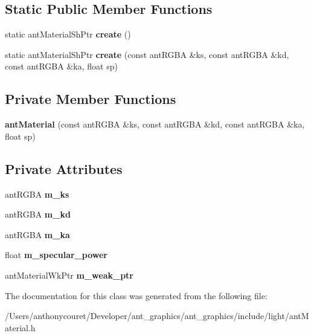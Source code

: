 \subsection*{Static Public Member Functions}
\begin{DoxyCompactItemize}
\item 
\hypertarget{classant_material_a56f8f32c820e73b5944519d3e292dc37}{static ant\+Material\+Sh\+Ptr {\bfseries create} ()}\label{classant_material_a56f8f32c820e73b5944519d3e292dc37}

\item 
\hypertarget{classant_material_af41bd92b1e438fdcef620d225f1164d1}{static ant\+Material\+Sh\+Ptr {\bfseries create} (const ant\+R\+G\+B\+A \&ks, const ant\+R\+G\+B\+A \&kd, const ant\+R\+G\+B\+A \&ka, float sp)}\label{classant_material_af41bd92b1e438fdcef620d225f1164d1}

\end{DoxyCompactItemize}
\subsection*{Private Member Functions}
\begin{DoxyCompactItemize}
\item 
\hypertarget{classant_material_a243812f97a9ba3baf5a4688b8ff2af23}{{\bfseries ant\+Material} (const ant\+R\+G\+B\+A \&ks, const ant\+R\+G\+B\+A \&kd, const ant\+R\+G\+B\+A \&ka, float sp)}\label{classant_material_a243812f97a9ba3baf5a4688b8ff2af23}

\end{DoxyCompactItemize}
\subsection*{Private Attributes}
\begin{DoxyCompactItemize}
\item 
\hypertarget{classant_material_ae0144cb7c18b85e361558bc1e8856381}{ant\+R\+G\+B\+A {\bfseries m\+\_\+ks}}\label{classant_material_ae0144cb7c18b85e361558bc1e8856381}

\item 
\hypertarget{classant_material_acbb5f8f6e82a2e6535ac4f0199c27cee}{ant\+R\+G\+B\+A {\bfseries m\+\_\+kd}}\label{classant_material_acbb5f8f6e82a2e6535ac4f0199c27cee}

\item 
\hypertarget{classant_material_a861d87f61edd40d3637c369fb6ae0aed}{ant\+R\+G\+B\+A {\bfseries m\+\_\+ka}}\label{classant_material_a861d87f61edd40d3637c369fb6ae0aed}

\item 
\hypertarget{classant_material_a0502d987cd803cb7071b8bd40b66eb67}{float {\bfseries m\+\_\+specular\+\_\+power}}\label{classant_material_a0502d987cd803cb7071b8bd40b66eb67}

\item 
\hypertarget{classant_material_a4826c122273dac93756ecc116e92b83e}{ant\+Material\+Wk\+Ptr {\bfseries m\+\_\+weak\+\_\+ptr}}\label{classant_material_a4826c122273dac93756ecc116e92b83e}

\end{DoxyCompactItemize}


The documentation for this class was generated from the following file\+:\begin{DoxyCompactItemize}
\item 
/\+Users/anthonycouret/\+Developer/ant\+\_\+graphics/ant\+\_\+graphics/include/light/ant\+Material.\+h\end{DoxyCompactItemize}
